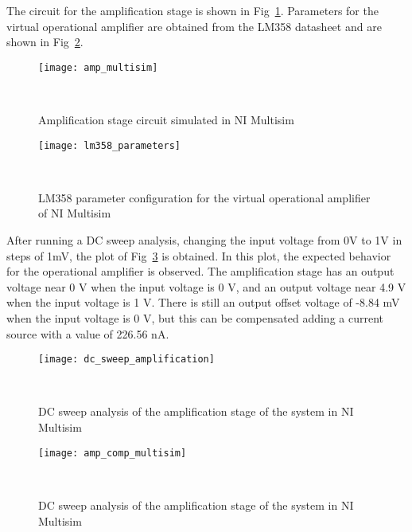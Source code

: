 The circuit for the amplification stage is shown in Fig~\ref{fig:amp_multisim}. Parameters for the virtual operational amplifier are obtained from the LM358 datasheet and are shown in Fig~\ref{fig:lm358_parameters}.

\begin{figure}[H]
    \centering
    \texttt{[image: amp\_multisim]}
    \caption{Amplification stage circuit simulated in NI Multisim}
~\label{fig:amp_multisim}
\end{figure}

\begin{figure}[H]
    \centering
    \texttt{[image: lm358\_parameters]}
    \caption{LM358 parameter configuration for the virtual operational amplifier of NI Multisim}
~\label{fig:lm358_parameters}
\end{figure}

After running a DC sweep analysis, changing the input voltage from 0V to 1V in steps of 1mV, the plot of Fig~\ref{fig:dc_sweep_amplification} is obtained. In this plot, the expected behavior for the operational amplifier is observed. The amplification stage has an output voltage near 0 V when the input voltage is 0 V, and an output voltage near 4.9 V when the input voltage is 1 V. There is still an output offset voltage of -8.84 mV when the input voltage is 0 V, but this can be compensated adding a current source with a value of 226.56 nA.

\begin{figure}[H]
    \centering
    \texttt{[image: dc\_sweep\_amplification]}
    \caption{DC sweep analysis of the amplification stage of the system in NI Multisim}
~\label{fig:dc_sweep_amplification}
\end{figure}


\begin{figure}[H]
    \centering
    \texttt{[image: amp\_comp\_multisim]}
    \caption{DC sweep analysis of the amplification stage of the system in NI Multisim}
~\label{fig:amp_comp_multisim}
\end{figure}



